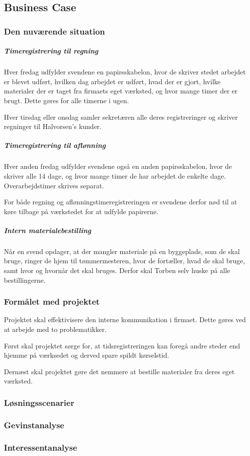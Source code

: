 \subsection{Business Case}
\subsubsection{Den nuværende situation}
\subparagraph{Timeregistrering til regning}

    Hver fredag udfylder svendene en papirsskabelon, hvor de skriver stedet arbejdet er blevet udført, hvilken dag arbejdet er udført, hvad der er gjort, hvilke materialer der er taget fra firmaets eget værksted, og hvor mange timer der er brugt.
    Dette gøres for alle timerne i ugen.
    
    Hver tirsdag eller onsdag samler sekretæren alle deres registreringer og skriver regninger til Halvorsen's kunder.

\subparagraph{Timeregistrering til aflønning}
    Hver anden fredag udfylder svendene også en anden papirsskabelon, hvor de skriver alle 14 dage, og hvor mange timer de har arbejdet de enkelte dage. Overarbejdstimer skrives separat.
    
    For både regning og aflønningstimeregistreringen er svendene derfor nød til at køre tilbage på værkstedet for at udfylde papirerne.
    
\subparagraph{Intern materialebestilling}
    Når en svend opdager, at der mangler materiale på en byggeplads, som de skal bruge, ringer de hjem til tømmermesteren, hvor de fortæller, hvad de skal bruge, samt hvor og hvornår det skal bruges. Derfor skal Torben selv huske på alle bestillingerne.
    
\subsubsection{Formålet med projektet}

    Projektet skal effektivisere den interne kommunikation i     firmaet.
    Dette gøres ved at arbejde med to problematikker.
    
    Først skal projektet sørge for, at tidsregistreringen kan foregå andre steder end hjemme på værksedet og derved spare spildt kørselstid.
    
    Dernæst skal projektet gøre det nemmere at bestille materialer fra deres eget værksted.

\subsubsection{Løsningsscenarier}

\subsubsection{Gevinstanalyse}

\subsubsection{Interessentanalyse}

